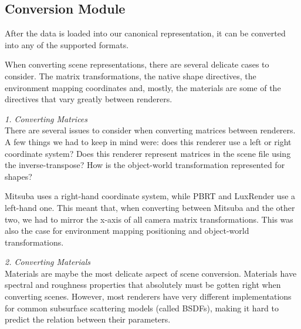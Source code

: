\subsection{Conversion Module}
After the data is loaded into our canonical
representation, it can be converted into any of the supported formats.

When converting scene representations, there are several delicate cases to
consider. The matrix transformations, the native shape
directives, the environment mapping coordinates and, mostly, the materials are
some of the directives that vary greatly between renderers. 

\textit{1. Converting Matrices} \\
There are several issues to consider when converting matrices between renderers.
A few things we had to keep in mind were: does this renderer use a left or right
coordinate system? Does this renderer represent matrices in the scene file using
the inverse-transpose? How is the object-world transformation represented for
shapes?

Mitsuba uses a right-hand coordinate system, while PBRT and LuxRender use a
left-hand one. This meant that, when converting between Mitsuba and the other
two, we had to mirror the x-axis of all camera matrix transformations. This was
also the case for environment mapping positioning and object-world
transformations.



\textit{2. Converting Materials} \\
Materials are maybe the most delicate aspect of scene conversion. Materials have
spectral and roughness properties that absolutely must be gotten right when
converting scenes. However, most renderers have very different implementations
for common subsurface scattering models (called BSDFs), making it hard to
predict the relation between their parameters.

